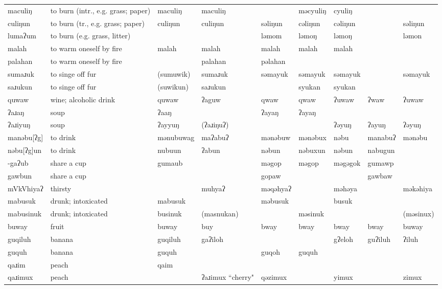 \begin{landscape}
\begin{longtable}{*{9}{p{}}}
\text{*}maculiŋ & to burn (intr., e.g. grass; paper) & maculiŋ & maculiŋ &  & məcyuliŋ & cyuliŋ &  & \\
\text{*}culiŋun & to burn (tr., e.g. grass; paper) & culiŋun & culiŋun & səliŋun & cəliŋun & cəliŋun &  & səliŋun\\
\text{*}lumaʔum & to burn (e.g. grass, litter) &  &  & ləmom & ləmoŋ & ləmoŋ &  & ləmon\\
\text{*}malah & to warm oneself by fire & malah & malah & malah & malah & malah &  & \\
\text{*}palahan & to warm oneself by fire &  & palahan & pəlahan &  &  &  & \\
\text{*}sumaɹuk & to singe off fur & (sumuwik) & sumaɹuk & səmayuk & səmayuk & səmayuk &  & səmayuk\\
\text{*}saɹukun & to singe off fur & (suwikun) & saɹukun &  & syukan & syukan &  & \\
\text{*}quwaw & wine; alcoholic drink & quwaw & ʔaguw & qwaw & qwaw & ʔuwaw & ʔwaw & ʔuwaw\\
\text{*}ʔaɹaŋ & soup & ʔaaŋ &  & ʔayaŋ & ʔayaŋ &  &  & \\
\text{*}ʔaɹiyuŋ & soup & ʔayyuŋ & (ʔaɹiŋuʔ) &  &  & ʔəyuŋ & ʔayuŋ & ʔəyuŋ\\
\text{*}manəbu[ʔg] & to drink & mənubuwag & maʔabuʔ & mənəbuw & mənəbux & nəbu & manabuʔ & mənəbu\\
\text{*}nəbu[ʔg]un & to drink & nubuun & ʔabun & nəbun & nəbuxun & nəbun & nabugun & \\
\text{*}-gaʔub & share a cup & gumaub &  & məgop & məgop & məgəgok & gumawp & \\
\text{*}gawbun & share a cup &  &  & gopaw &  &  & gawbaw & \\
\text{*}mVkVhiyaʔ & thirsty &  & muhyaʔ & məqəhyaʔ &  & məhəya &  & məkəhiya\\
\text{*}mabusuk & drunk; intoxicated & mabusuk &  & məbusuk &  & busuk &  & \\
\text{*}mabusinuk & drunk; intoxicated & businuk & (masnukan) &  & məsinuk &  &  & (məsinux)\\
\text{*}buway & fruit & buway & buy & bway & bway & bway & bway & buway\\
\text{*}guqiluh & banana & guqiluh & gaʔiloh &  &  & gʔeloh & guʔiluh & ʔiluh\\
\text{*}guquh & banana & guquh &  & guqoh & guquh &  &  & \\
\text{*}qaɹim & peach & qaim &  &  &  &  &  & \\
\text{*}qaɹimux & peach &  & ʔaɹimux ``cherry" & qəzimux &  & yimux &  & zimux\\

\end{longtable}
\end{landscape}
